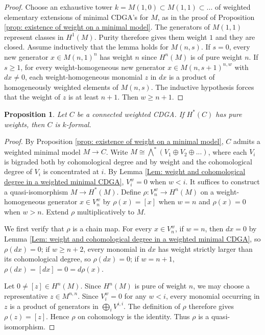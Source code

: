 \documentclass[11pt]{amsart}
\newtheorem{proposition}[theorem]{Proposition}
\theoremstyle{definition}
\numberwithin{equation}{section}
\numberwithin{equation}{section}
\begin{document}
\begin{proof}
Choose an exhaustive tower $k=M(1,0)\subset M(1,1)\subset ...$ of weighted elementary extensions of minimal CDGA's for $M$, as in the proof of Proposition \ref{prop: existence of weight on a minimal model}. The generators of $M(1,1)$ represent classes in $H^1(M)$. Purity therefore gives them weight $1$ and they are closed. Assume inductively that the lemma holds for $M(n,s)$. If $s=0$,  every new generator $x\in M(n,1)^n$ has weight $n$ since $H^n(M)$ is of pure weight $n$. If $s\geq 1$, for every weight-homogeneous new generator $x\in M(n,s+1)^{n,w}$ with $dx\neq 0$, each weight-homogeneous monomial $z$ in $dx$ is a product of homogeneously weighted elements of $M(n,s)$. The inductive hypothesis forces that the weight of $z$ is at least $n+1$. Then $w\geq n+1$.
\end{proof}

\begin{proposition}\label{Prop: purity implies formality}
Let $C$ be a connected weighted CDGA. If $H^*(C)$ has pure weights, then $C$ is $k$-formal. 
\end{proposition}

\begin{proof}
By Proposition \ref{prop: existence of weight on a minimal model}, $C$ admits a weighted minimal model $M\rightarrow C$. Write $M\cong \bigwedge^*(V_1\oplus V_2\oplus ... )$, where each $V_i$ is bigraded both by cohomological degree and by weight and the cohomological degree of $V_i$ is concentrated at $i$. By Lemma \ref{Lem: weight and cohomological degree in a weighted minimal CDGA}, $V_i^w=0$ when $w<i$. It suffices to construct a quasi-isomorphism $M\rightarrow H^*(M)$. Define $\rho:V_n^w\rightarrow H^n(M)$ on a weight-homogeneous generator $x\in V_n^w$ by $\rho(x)=[x]$ when $w=n$ and $\rho(x)=0$ when $w>n$. Extend $\rho$ multiplicatively to $M$.

We first verify that $\rho$ is a chain map. For every $x\in V_n^w$, if $w=n$, then $dx=0$ by Lemma \ref{Lem: weight and cohomological degree in a weighted minimal CDGA}, so $\rho(dx)=0$; if $w\geq n+2$, every monomial in $dx$ has weight strictly larger than its cohomological degree, so $\rho(dx)=0$; if $w=n+1$, $\rho(dx)=[dx]=0=d\rho (x)$.

Let $0\neq [z]\in H^n(M)$. Since $H^n(M)$ is pure of weight $n$, we may choose a representative $z\in M^{n,n}$. Since $V^{w}_i=0$ for any $w<i$, every monomial occurring in $z$ is a product of generators in $\bigoplus_i V^{i,i}$. The definition of $\rho$ therefore gives $\rho(z)=[z]$. Hence $\rho$ on cohomology is the identity. Thus $\rho$ is a quasi-isomorphism.
\end{proof}
\end{document}
